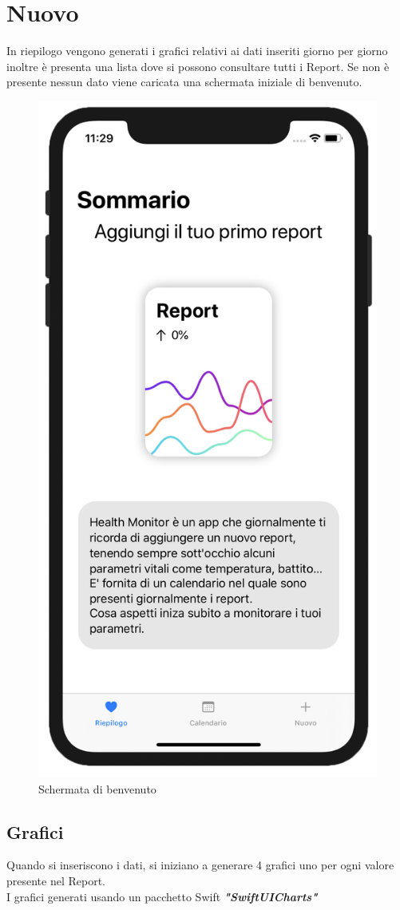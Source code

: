 \documentclass{article}
\begin{document}
\newpage
\section{Nuovo}

In riepilogo vengono generati i grafici relativi ai dati inseriti giorno per giorno inoltre è presenta una lista dove si possono consultare tutti i Report. Se non è presente nessun dato viene caricata una schermata iniziale di benvenuto. 

\begin{figure}[htp]

\centering
\includegraphics[width=.3\textwidth]{img/riepilogo_iniziale.png}

\caption{Schermata di benvenuto}
\label{fig:figure3}
\end{figure}

\subsection{Grafici}

Quando si inseriscono i dati, si iniziano a generare 4 grafici uno per ogni valore presente nel Report.\\
I grafici generati usando un pacchetto Swift \textbf{\textit{"SwiftUICharts"}}











\end{document}
